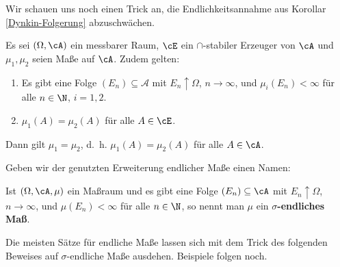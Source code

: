 Wir schauen uns noch einen Trick an, die Endlichkeitsannahme aus Korollar \ref{Dynkin-Folgerung} abzuschw\"achen.
\begin{korollar}[Eindeutigkeitssatz]\label{folg}
	Es sei $(\Omega, \cA)$ ein messbarer Raum, $\cE$ ein $\cap$-stabiler Erzeuger von $\cA$ und $\mu_1,\mu_2$ seien Maße auf $\cA$. Zudem gelten:
	\begin{enumerate}[label=(\roman*)]		
		\item Es gibt eine Folge $(E_n) \subseteq \mathcal A$ mit $E_n \uparrow \Omega$, $n \to \infty$, und $\mu_i(E_n) < \infty$ für alle $n \in \N$, $i = 1,2$.		
		\item $\mu_1(A) = \mu_2(A)$ für alle $A \in \cE$.
	\end{enumerate}
	Dann gilt $\mu_1 = \mu_2$, \mbox{d. h.} $\mu_1(A) = \mu_2(A)$ für alle $A \in \cA$.
\end{korollar}
Geben wir der genutzten Erweiterung endlicher Ma\ss e einen Namen: 
\begin{deff}
	Ist $(\Omega, \cA, \mu)$ ein Maßraum und es gibt eine Folge $(E_n) \subseteq \cA$ mit $E_n \uparrow \Omega$, $n \to \infty$, und $\mu(E_n) < \infty$ f\"ur alle $n \in \N$, so nennt man $\mu$ ein \textbf{$\sigma$-endliches Maß}.
\end{deff}
Die meisten S\"atze f\"ur endliche Ma\ss e lassen sich mit dem Trick des folgenden Beweises auf $\sigma$-endliche Ma\ss e ausdehen. Beispiele folgen noch.

